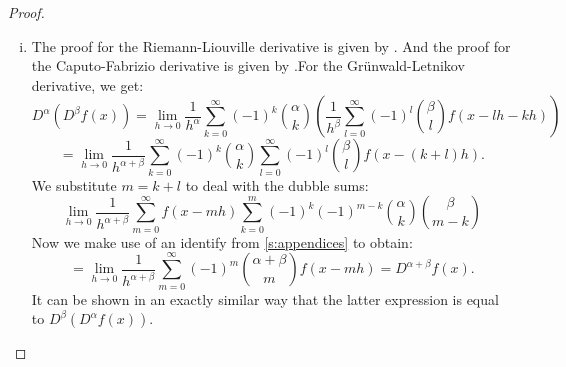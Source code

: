 \begin{proof}
\begin{enumerate}[(i)]
        \item The proof for the Riemann-Liouville derivative is given by \cite{koning15}. And the proof for the Caputo-Fabrizio derivative is given by \cite{losada15}.For the Grünwald-Letnikov derivative, we get:
        \[ D^\alpha(D^\beta f(x)) = \lim_{h \to 0} \frac{1}{h^\alpha} \sum_{k=0}^\infty (-1)^k \binom{\alpha}{k}(  \frac{1}{h^\beta} \sum_{l=0}^\infty (-1)^l \binom{\beta}{l} f(x - l h - kh))\]
        \[= \lim_{h \to 0} \frac{1}{h^{\alpha + \beta}} \sum_{k=0}^\infty (-1)^k \binom{\alpha}{k} \sum_{l=0}^\infty (-1)^l \binom{\beta}{l} f(x - (k + l)h).\] We substitute \(m = k + l\) to deal with the dubble sums: 
        \[ \lim_{h \to 0} \frac{1}{h^{\alpha + \beta}} \sum_{m=0}^\infty f(x - mh)  \sum_{k=0}^m (-1)^k (-1)^{ m - k} \binom{\alpha}{k} \binom{\beta}{m - k}\] Now we make use of an identify from \autoref{s:appendices} to obtain:
        \[ = \lim_{h \to 0} \frac{1}{h^{\alpha + \beta}} \sum_{m=0}^\infty (-1)^m \binom{\alpha + \beta}{m} f(x - mh) = D^{\alpha + \beta} f(x).\]
        It can be shown in an exactly similar way that the latter expression is equal to \(D^\beta(D^\alpha f(x))\).

        
    \end{enumerate}
\end{proof}

